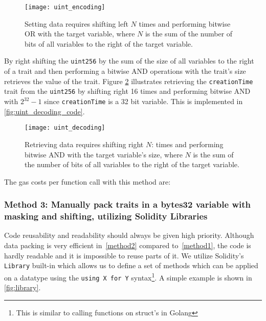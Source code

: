 \begin{figure}[H]
    \centering
    \texttt{[image: uint\_encoding]}
    \caption{Setting data requires shifting left $N$ times and performing bitwise OR with the target variable, where $N$ is the sum of the number of bits of all variables to the right of the target variable.}
    \label{fig:uint_encoding}
\end{figure}

By right shifting the \texttt{uint256} by the sum of the size of all variables to the right of a trait and then performing a bitwise AND operations with the trait's size retrieves the value of the trait. Figure \ref{fig:uint_decoding} illustrates retrieving the \texttt{creationTime} trait from the \texttt{uint256} by shifting right 16 times and performing bitwise AND with $2^32-1$ since \texttt{creationTime} is a 32 bit variable. This is implemented in \ref{fig:uint_decoding_code}.

\begin{figure}[H]
    \centering
    \texttt{[image: uint\_decoding]}
    \caption{Retrieving data requires shifting right $N$: times and performing bitwise AND with the target variable's size, where $N$ is the sum of the number of bits of all variables to the right of the target variable.}
    \label{fig:uint_decoding}
\end{figure}

The gas costs per function call with this method are: 


\subsubsection{Method 3: Manually pack traits in a bytes32 variable with masking and shifting, utilizing Solidity Libraries} \label{method3}

Code reusability and readability should always be given high priority. Although data packing is very efficient in~\ref{method2} compared to~\ref{method1}, the code is hardly readable and it is impossible to reuse parts of it. %
We utilize Solidity's \texttt{Library} built-in which allows us to define a set of methods which can be applied on a datatype using the \texttt{using X for Y} syntax\footnote{This is similar to calling functions on struct's in Golang}. A simple example is shown in \ref{fig:library}.

